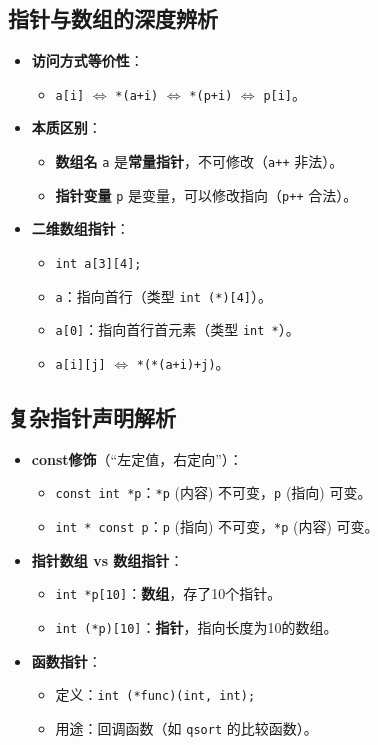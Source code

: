 \documentclass[a4paper,12pt]{article}
\begin{document}
\subsection{指针与数组的深度辨析}
\begin{itemize}
    \item \textbf{访问方式等价性}：
    \begin{itemize}
        \item \texttt{a[i]} $\iff$ \texttt{*(a+i)} $\iff$ \texttt{*(p+i)} $\iff$ \texttt{p[i]}。
    \end{itemize}
    \item \textbf{本质区别}：
    \begin{itemize}
        \item \textbf{数组名} \texttt{a} 是\textbf{常量指针}，不可修改（\texttt{a++} 非法）。
        \item \textbf{指针变量} \texttt{p} 是变量，可以修改指向（\texttt{p++} 合法）。
    \end{itemize}
    \item \textbf{二维数组指针}：
    \begin{itemize}
        \item \texttt{int a[3][4];}
        \item \texttt{a}：指向首行（类型 \texttt{int (*)[4]}）。
        \item \texttt{a[0]}：指向首行首元素（类型 \texttt{int *}）。
        \item \texttt{a[i][j]} $\iff$ \texttt{*(*(a+i)+j)}。
    \end{itemize}
\end{itemize}

\subsection{复杂指针声明解析}
\begin{itemize}
    \item \textbf{const修饰}（“左定值，右定向”）：
    \begin{itemize}
        \item \texttt{const int *p}：\texttt{*p} (内容) 不可变，\texttt{p} (指向) 可变。
        \item \texttt{int * const p}：\texttt{p} (指向) 不可变，\texttt{*p} (内容) 可变。
    \end{itemize}
    \item \textbf{指针数组 vs 数组指针}：
    \begin{itemize}
        \item \texttt{int *p[10]}：\textbf{数组}，存了10个指针。
        \item \texttt{int (*p)[10]}：\textbf{指针}，指向长度为10的数组。
    \end{itemize}
    \item \textbf{函数指针}：
    \begin{itemize}
        \item 定义：\texttt{int (*func)(int, int);}
        \item 用途：回调函数（如 \texttt{qsort} 的比较函数）。
    \end{itemize}
\end{itemize}
\end{document}
